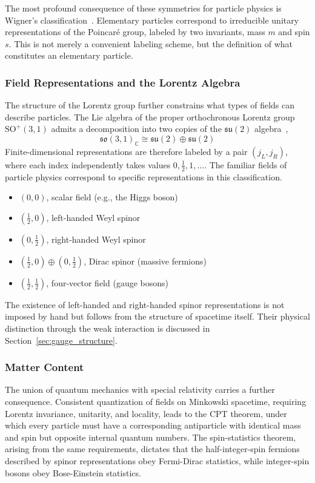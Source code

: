 The most profound consequence of these symmetries for particle physics is Wigner's classification~\cite{Wigner:1939cj}. Elementary particles correspond to irreducible unitary representations of the Poincar\'{e} group, labeled by two invariants, mass $m$ and spin $s$. This is not merely a convenient labeling scheme, but the definition of what constitutes an elementary particle.

\subsubsection{Field Representations and the Lorentz Algebra}

The structure of the Lorentz group further constrains what types of fields can describe particles. The Lie algebra of the proper orthochronous Lorentz group $\mathrm{SO}^+(3,1)$ admits a decomposition into two copies of the $\mathfrak{su}(2)$ algebra~\cite{Weinberg:1995mt},
\begin{equation}
\mathfrak{so}(3,1)_{\mathbb{C}} \cong \mathfrak{su}(2) \oplus \mathfrak{su}(2)
\end{equation}
Finite-dimensional representations are therefore labeled by a pair $(j_L, j_R)$, where each index independently takes values $0, \frac{1}{2}, 1, \ldots$. The familiar fields of particle physics correspond to specific representations in this classification.
\begin{itemize}
\item $(0, 0)$, scalar field (e.g., the Higgs boson)
\item $(\frac{1}{2}, 0)$, left-handed Weyl spinor
\item $(0, \frac{1}{2})$, right-handed Weyl spinor
\item $(\frac{1}{2}, 0) \oplus (0, \frac{1}{2})$, Dirac spinor (massive fermions)
\item $(\frac{1}{2}, \frac{1}{2})$, four-vector field (gauge bosons)
\end{itemize}
The existence of left-handed and right-handed spinor representations is not imposed by hand but follows from the structure of spacetime itself. Their physical distinction through the weak interaction is discussed in Section~\ref{sec:gauge_structure}.

\subsubsection{Matter Content}

The union of quantum mechanics with special relativity carries a further consequence. Consistent quantization of fields on Minkowski spacetime, requiring Lorentz invariance, unitarity, and locality, leads to the CPT theorem, under which every particle must have a corresponding antiparticle with identical mass and spin but opposite internal quantum numbers. The spin-statistics theorem, arising from the same requirements, dictates that the half-integer-spin fermions described by spinor representations obey Fermi-Dirac statistics, while integer-spin bosons obey Bose-Einstein statistics.

